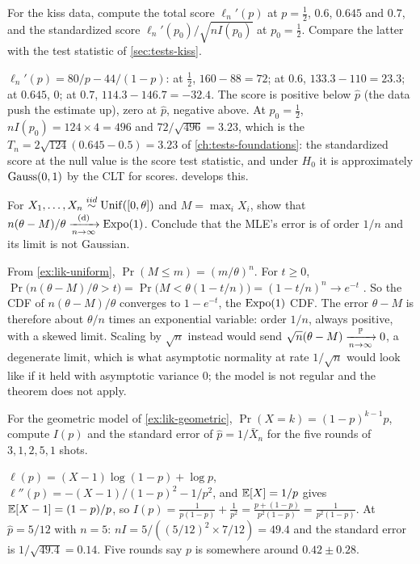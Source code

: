 \begin{exercise}
\label{ex:mle-score-kiss}
For the kiss data, compute the total score $\ell_n'(p)$ at $p = \frac12$, $0.6$, $0.645$ and $0.7$, and the standardized score $\ell_n'(p_0)/\sqrt{nI(p_0)}$ at $p_0 = \frac12$. Compare the latter with the test statistic of \cref{sec:tests-kiss}.
\end{exercise}
\begin{solution}
$\ell_n'(p) = 80/p - 44/(1 - p)$: at $\frac12$, $160 - 88 = 72$; at $0.6$, $133.3 - 110 = 23.3$; at $0.645$, $0$; at $0.7$, $114.3 - 146.7 = -32.4$. The score is positive below $\hat{p}$ (the data push the estimate up), zero at $\hat{p}$, negative above. At $p_0 = \frac12$, $nI(p_0) = 124 \times 4 = 496$ and $72/\sqrt{496} = 3.23$, which is the $T_n = 2\sqrt{124}(0.645 - 0.5) = 3.23$ of \cref{ch:tests-foundations}: the standardized score at the null value is the score test statistic, and under $H_0$ it is approximately $\text{Gauss}(0, 1)$ by the CLT for scores.  develops this.
\end{solution}

\begin{exercise}
\label{ex:mle-uniform-rate}
For $X_1, \ldots, X_n \stackrel{iid}{\sim} \mathrm{Unif}([0, \theta])$ and $M = \max_i X_i$, show that $n(\theta - M)/\theta \xrightarrow [n \to \infty ]{\text{(d)}} \text{Expo}(1)$. Conclude that the MLE's error is of order $1/n$ and its limit is not Gaussian.
\end{exercise}
\begin{solution}
From \cref{ex:lik-uniform}, $\Pr(M \leq m) = (m/\theta)^n$. For $t \geq 0$, $\Pr\big(n(\theta - M)/\theta > t\big) = \Pr\big(M < \theta(1 - t/n)\big) = (1 - t/n)^n \to e^{-t}$ . So the CDF of $n(\theta - M)/\theta$ converges to $1 - e^{-t}$, the $\text{Expo}(1)$ CDF. The error $\theta - M$ is therefore about $\theta/n$ times an exponential variable: order $1/n$, always positive, with a skewed limit. Scaling by $\sqrt{n}$ instead would send $\sqrt{n}(\theta - M) \xrightarrow [n \to \infty ]{\mathbb{P}} 0$, a degenerate limit, which is what asymptotic normality at rate $1/\sqrt{n}$ would look like if it held with asymptotic variance $0$; the model is not regular and the theorem does not apply.
\end{solution}

\begin{exercise}
\label{ex:mle-geometric-info}
For the geometric model of \cref{ex:lik-geometric}, $\Pr(X = k) = (1-p)^{k-1}p$, compute $I(p)$ and the standard error of $\hat{p} = 1/\bar{X}_n$ for the five rounds of $3, 1, 2, 5, 1$ shots.
\end{exercise}
\begin{solution}
$\ell(p) = (X - 1)\log(1 - p) + \log p$, $\ell''(p) = -(X - 1)/(1-p)^2 - 1/p^2$, and $\operatorname*{\mathbb{E}}[X] = 1/p$ gives $\operatorname*{\mathbb{E}}[X - 1] = (1 - p)/p$, so $I(p) = \frac{1}{p(1-p)} + \frac{1}{p^2} = \frac{p + (1 - p)}{p^2(1 - p)} = \frac{1}{p^2(1-p)}$. At $\hat{p} = 5/12$ with $n = 5$: $nI = 5/((5/12)^2 \times 7/12) = 49.4$ and the standard error is $1/\sqrt{49.4} = 0.14$. Five rounds say $p$ is somewhere around $0.42 \pm 0.28$.
\end{solution}

